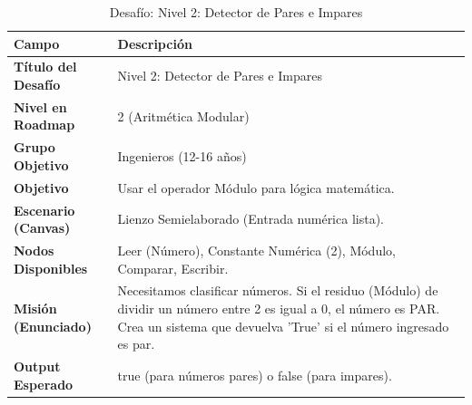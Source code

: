 \begin{table}[H]
    \centering
    \caption{Desafío: Nivel 2: Detector de Pares e Impares}
    \label{tab:desafio-ing-2}
    \begingroup
    \renewcommand{\arraystretch}{\TableRowStretch}
    \begin{tabularx}{\textwidth}{ l X }
        \hline
        \textbf{Campo}              & \textbf{Descripción}                                                                                                                                                                   \\
        \hline
        \textbf{Título del Desafío} & Nivel 2: Detector de Pares e Impares                                                                                                                                                   \\
        \textbf{Nivel en Roadmap}   & 2 (Aritmética Modular)                                                                                                                                                                 \\
        \textbf{Grupo Objetivo}     & Ingenieros (12-16 años)                                                                                                                                                                \\
        \textbf{Objetivo}           & Usar el operador Módulo para lógica matemática.                                                                                                                                        \\
        \textbf{Escenario (Canvas)} & Lienzo Semielaborado (Entrada numérica lista).                                                                                                                                         \\
        \textbf{Nodos Disponibles}  & Leer (Número), Constante Numérica (2), Módulo, Comparar, Escribir.                                                                                                                     \\
        \textbf{Misión (Enunciado)} & Necesitamos clasificar números. Si el residuo (Módulo) de dividir un número entre 2 es igual a 0, el número es PAR. Crea un sistema que devuelva 'True' si el número ingresado es par. \\
        \textbf{Output Esperado}    & true (para números pares) o false (para impares).                                                                                                                                      \\
        \hline
    \end{tabularx}
    \endgroup
\end{table}

